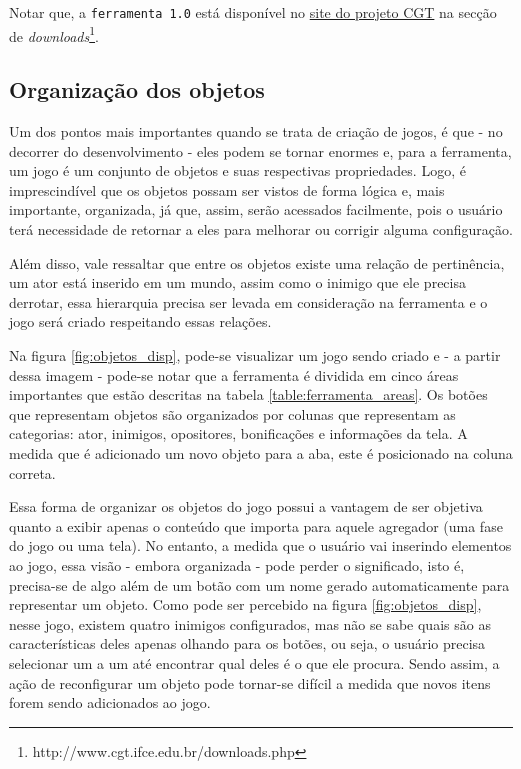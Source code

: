 \documentclass[12pt,twoside,openright,a4paper,english,brazil,sumario=tradicional]{abntex2}
\begin{document}
Notar que, a \texttt{ferramenta 1.0} está disponível no \href{http://www.cgt.ifce.edu.br/downloads.php}{site do projeto CGT} na secção de \emph{downloads}\footnote{http://www.cgt.ifce.edu.br/downloads.php}.

\subsection{Organização dos objetos}
Um dos pontos mais importantes quando se trata de criação de jogos, é que - no decorrer do desenvolvimento - eles podem se tornar enormes e, para a ferramenta, um jogo é um conjunto de objetos e suas respectivas propriedades. Logo, é imprescindível que os objetos possam ser vistos de forma lógica e, mais importante, organizada, já que, assim, serão acessados facilmente, pois o usuário terá necessidade de retornar a eles para melhorar ou corrigir alguma configuração.

Além disso, vale ressaltar que entre os objetos existe uma relação de pertinência, um ator está inserido em um mundo, assim como o inimigo que ele precisa derrotar, essa hierarquia precisa ser levada em consideração na ferramenta e o jogo será criado respeitando essas relações.

Na figura \ref{fig:objetos_disp}, pode-se visualizar um jogo sendo criado e - a partir dessa imagem - pode-se notar que a ferramenta é dividida em cinco áreas importantes que estão descritas na tabela \ref{table:ferramenta_areas}. Os botões que representam objetos são organizados por colunas que representam as categorias: ator, inimigos, opositores, bonificações e informações da tela. A medida que é adicionado um novo objeto para a aba, este é posicionado na coluna correta.

Essa forma de organizar os objetos do jogo possui a vantagem de ser objetiva quanto a exibir apenas o conteúdo que importa para aquele agregador (uma fase do jogo ou uma tela). No entanto, a medida que o usuário vai inserindo elementos ao jogo, essa visão - embora organizada - pode perder o significado, isto é, precisa-se de algo além de um botão com um nome gerado automaticamente para representar um objeto. Como pode ser percebido na figura \ref{fig:objetos_disp}, nesse jogo, existem quatro inimigos configurados, mas não se sabe quais são as características deles apenas olhando para os botões, ou seja, o usuário precisa selecionar um a um até encontrar qual deles é o que ele procura. Sendo assim, a ação de reconfigurar um objeto pode tornar-se difícil a medida que novos itens forem sendo adicionados ao jogo.
\end{document}
